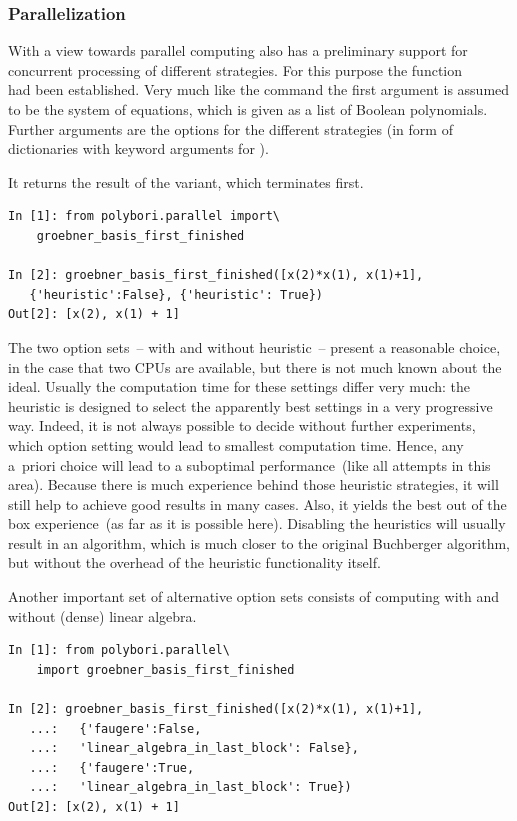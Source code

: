 \subsubsection{Parallelization}
With a view towards parallel computing \PolyBoRi also has a preliminary support
for concurrent processing of  different strategies.
For this purpose the function\\
 had been established.
Very much like the command 
the first argument is assumed to be the system of equations,
which is given as a list of Boolean polynomials.
Further arguments are the options for the different strategies (in form of dictionaries with keyword arguments for ).

It returns the result of the variant, which  terminates first.

\begin{lstlisting}
In [1]: from polybori.parallel import\
    groebner_basis_first_finished

In [2]: groebner_basis_first_finished([x(2)*x(1), x(1)+1],
   {'heuristic':False}, {'heuristic': True}) 
Out[2]: [x(2), x(1) + 1]
\end{lstlisting} 
The two option sets~-- with and without heuristic~--
present a reasonable choice, in the case that two CPUs are available, but there
is not much known about the ideal.
Usually the computation time for these settings differ very much:
the heuristic is designed to select the apparently best settings in a very
progressive way.
Indeed, it is not always possible to decide
without further experiments, which option setting would lead to  smallest
computation time. Hence, any a~priori choice will lead to a suboptimal
performance~(like all attempts in this area). 
Because there is much experience behind those heuristic strategies, it will
still help to achieve good results  in many cases. Also, it yields the
best out of the box experience~(as far as it is possible here).
Disabling the heuristics will usually result in an
algorithm, which is much closer to the original Buchberger
algorithm, but without the overhead of the heuristic
functionality itself.

Another important set of alternative option sets consists of computing with and
without (dense) linear algebra.

\begin{lstlisting}
In [1]: from polybori.parallel\
    import groebner_basis_first_finished

In [2]: groebner_basis_first_finished([x(2)*x(1), x(1)+1],
   ...:   {'faugere':False,
   ...:   'linear_algebra_in_last_block': False}, 
   ...:   {'faugere':True,
   ...:   'linear_algebra_in_last_block': True})
Out[2]: [x(2), x(1) + 1]

\end{lstlisting}

